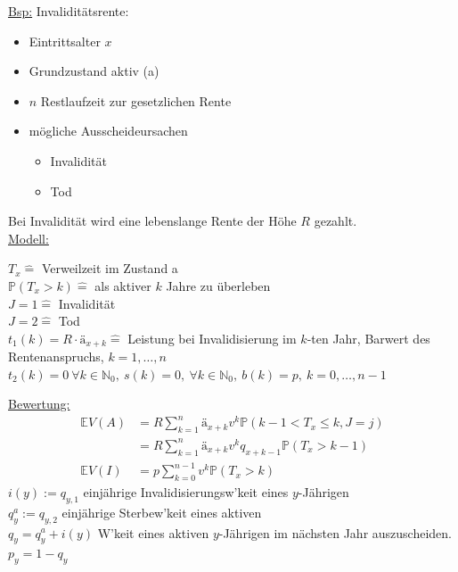 \uline{Bsp:} Invaliditätsrente:\\
\begin{itemize}
	\item Eintrittsalter $x$
	\item Grundzustand aktiv (a)
	\item $n$ Restlaufzeit zur gesetzlichen Rente
	\item mögliche Ausscheideursachen
	\begin{itemize}
		\item Invalidität
		\item Tod
	\end{itemize}
\end{itemize}
Bei Invalidität wird eine lebenslange Rente der Höhe $R$ gezahlt.\\
\uline{Modell:}\\
\begin{center}
	$T_x \mathrel{\hat{=}}$ Verweilzeit im Zustand a\\
	$\mathds{P}(T_x>k) \mathrel{\hat{=}}$ als aktiver $k$ Jahre zu überleben\\
	$J=1 \mathrel{\hat{=}}$ Invalidität\\
	$J=2 \mathrel{\hat{=}}$ Tod\\
	$t_1(k)=R\cdot ä_{x+k} \mathrel{\hat{=}}$ Leistung bei Invalidisierung im $k$-ten Jahr, Barwert des Rentenanspruchs, $k=1,\dots,n$\\
	$t_2(k)=0~\forall k\in \mathds{N}_0,~s(k)=0,~\forall k\in \mathds{N}_0,~b(k)=p,~ k=0,\dots,n-1$
\end{center}
\uline{Bewertung:}\\
\begin{equation*}
\begin{aligned}
	\mathds{E}V(A) &= R\sum_{k=1}^{n}ä_{x+k}v^k\mathds{P}(k-1<T_x\le k,J=j)\\
	&= R\sum_{k=1}^{n}ä_{x+k}v^kq_{x+k-1}\mathds{P}(T_x>k-1)\\
	\mathds{E}V(I) &= p\sum_{k=0}^{n-1}v^k\mathds{P}(T_x>k)
\end{aligned}
\end{equation*}
$i(y):=q_{y,1}$ einjährige Invalidisierungsw'keit eines $y$-Jährigen\\
$q_y^a:=q_{y,2}$ einjährige Sterbew'keit eines aktiven\\
$q_y=q_y^a+i(y)$ W'keit eines aktiven $y$-Jährigen im nächsten Jahr auszuscheiden.\\
$p_y=1-q_y$\\

